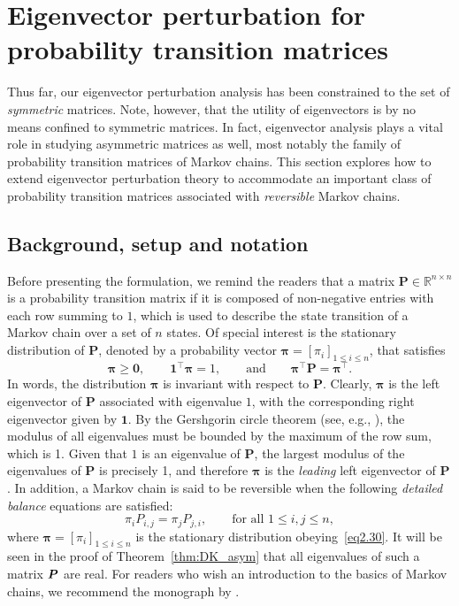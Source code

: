 \section{Eigenvector perturbation for probability transition matrices}
\label{sec:eigenvector-theory-DK}


Thus far, our eigenvector perturbation analysis has been constrained to the set of \emph{symmetric}
matrices. Note, however, that the utility of eigenvectors is by no means confined to symmetric matrices.
In fact, eigenvector analysis  plays a vital role in studying  asymmetric matrices as well, most notably the family of probability transition matrices of Markov chains.  This section explores how to extend eigenvector perturbation theory to accommodate an important class of probability transition matrices associated with \emph{reversible} Markov chains.




\subsection{Background, setup and notation}
\label{subsec:Setup-and-notation-prob-matrix}

Before presenting the formulation, we remind the readers that a matrix $\bm{P}\in\mathbb{R}^{n\times n}$
is a probability transition matrix if it is composed of non-negative entries with
each row summing to $1$, which is used to describe the state transition of a Markov chain over a set of $n$ states.
Of special interest is the stationary distribution of $\bm{P}$, denoted by a probability vector $\bm{\pi}=[\pi_i]_{1\leq i\leq n}$,
that satisfies
%
\begin{equation}\label{eq2.30}
\bm{\pi}\geq\bm{0},\qquad\bm{1}^{\top}\bm{\pi}=1,\qquad\text{and}\qquad\bm{\pi}^{\top}\bm{P}=\bm{\pi}^{\top}.
\end{equation}
%
In words, the distribution $\bm{\pi}$ is invariant with respect to $\bm{P}$.
Clearly, $\bm{\pi}$ is the left eigenvector of $\bm{P}$ associated with eigenvalue $1$, with the corresponding right eigenvector given by $\bm{1}$.  By the  Gershgorin circle theorem (see, e.g., \citet{olver2006applied}), the modulus of all eigenvalues must be bounded by the maximum of the row sum, which is  1.  Given that $1$ is an eigenvalue of $\bm{P}$, the largest modulus of the eigenvalues of $\bm{P}$ is precisely 1, and therefore $\bm{\pi}$ is the {\em leading} left eigenvector of $\bm{P}$.
In addition, a Markov chain is said to be reversible when the following {\em detailed balance} equations are satisfied:
%
\begin{equation}
	\pi_{i} P_{i,j} =\pi_{j} P_{j,i},  \qquad \text{for all }1\leq i,j\leq n, \label{eq:detailed-balance}
\end{equation}
%
where $\bm{\pi}=[\pi_i]_{1\leq i\leq n}$ is the stationary distribution obeying~\eqref{eq2.30}.  It will be seen in the proof of Theorem~\ref{thm:DK_asym} that all eigenvalues of such a matrix ${\boldsymbol P}$ are real. For readers who wish  an introduction to the basics of Markov chains, 
we recommend  the monograph by \citet{bremaud2013markov}.



